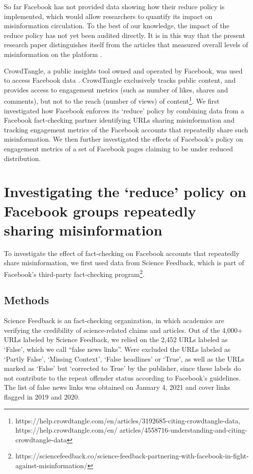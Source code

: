 \documentclass[11pt,a4paper]{article}
\begin{document}
So far Facebook has not provided data showing how their reduce policy is implemented, which would allow researchers to quantify its impact on misinformation circulation. 
To the best of our knowledge, the impact of the reduce policy has not yet been audited directly. 
It is in this way that the present research paper distinguishes itself from the articles that measured overall levels of misinformation on the platform \citep{allcott2019trends, kornbluh2020new, resnick2018iffy}. 

CrowdTangle, a public insights tool owned and operated by Facebook, was used to access Facebook data \citep{team2020crowdtangle}. 
CrowdTangle exclusively tracks public content, and provides access to engagement metrics (such as number of likes, shares and comments), but not to the reach (number of views) of content\footnote{https://help.crowdtangle.com/en/articles/3192685-citing-crowdtangle-data, https://help.crowdtangle.com/en/
articles/4558716-understanding-and-citing-crowdtangle-data}. 
We first investigated how Facebook enforces its ‘reduce’ policy by combining data from a Facebook fact-checking partner identifying URLs sharing misinformation and tracking engagement metrics of the Facebook accounts that repeatedly share such misinformation. 
We then further investigated the effects of Facebook’s policy on engagement metrics of a set of Facebook pages claiming to be under reduced distribution.

\section{Investigating the `reduce’ policy on Facebook groups repeatedly sharing misinformation}

To investigate the effect of fact-checking on Facebook accounts that repeatedly share misinformation, we first used data from Science Feedback, which is part of Facebook’s third-party fact-checking program\footnote{https://sciencefeedback.co/science-feedback-partnering-with-facebook-in-fight-against-misinformation/}.

\subsection{Methods}

Science Feedback is an fact-checking organization, in which academics are verifying the credibility of science-related claims and articles. 
Out of the 4,000+ URLs labeled by Science Feedback, we relied on the 2,452 URLs labeled as `False', which we call ``false news links''. 
Were excluded the URLs labeled as `Partly False', `Missing Context', `False headlines' or `True', as well as the URLs marked as `False' but `corrected to True' by the publisher, since these labels do not contribute to the repeat offender status according to Facebook's guidelines. 
The list of false news links was obtained on January 4, 2021 and cover links flagged in 2019 and 2020.
\end{document}
